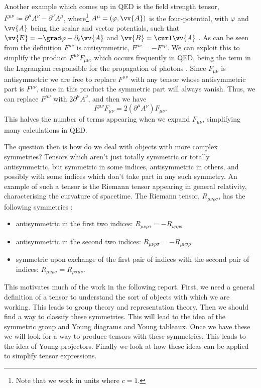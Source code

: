 \documentclass[fleqn]{NotesClass}
\begin{document}
    Another example which comes up in QED is the field strength tensor, \(F^{\mu\nu} \coloneqq \partial^\mu A^\nu - \partial^\nu A^\mu\), where\footnote{Note that we work in units where \(c = 1\).} \(A^\mu = (\varphi, \vv{A})\) is the four-potential, with \(\varphi\) and \(\vv{A}\) being the scalar and vector potentials, such that \(\vv{E} = -\grad\varphi - \partial_t\vv{A}\) and \(\vv{B} = \curl\vv{A}\) \cite[569]{griffiths}.
    As can be seen from the definition \(F^{\mu\nu}\) is antisymmetric, \(F^{\mu\nu} = -F^{\nu\mu}\).
    We can exploit this to simplify the product \(F^{\mu\nu}F_{\mu\nu}\), which occurs frequently in QED, being the term in the Lagrangian responsible for the propagation of photons \cite[294]{peskin}.
    Since \(F_{\mu\nu}\) is antisymmetric we are free to replace \(F^{\mu\nu}\) with any tensor whose antisymmetric part is \(F^{\mu\nu}\), since in this product the symmetric part will always vanish.
    Thus, we can replace \(F^{\mu\nu}\) with \(2\partial^\mu A^\nu\), and then we have
    \begin{equation}
        F^{\mu\nu}F_{\mu\nu} = 2(\partial^\mu A^\nu)F_{\mu\nu}.
    \end{equation}
    This halves the number of terms appearing when we expand \(F_{\mu\nu}\), simplifying many calculations in QED.
    
    The question then is how do we deal with objects with more complex symmetries?
    Tensors which aren't just totally symmetric or totally antisymmetric, but symmetric in some indices, antisymmetric in others, and possibly with some indices which don't take part in any such symmetry.
    An example of such a tensor is the Riemann tensor appearing in general relativity, characterising the curvature of spacetime.
    The Riemann tensor, \(R_{\mu\nu\rho\sigma}\), has the following symmetries \cite[141]{weinberg}:
    \begin{itemize}
        \item antisymmetric in the first two indices: \(R_{\mu\nu\rho\sigma} = -R_{\nu\mu\rho\sigma}\)
        \item antisymmetric in the second two indices: \(R_{\mu\nu\rho\sigma} = -R_{\mu\nu\sigma\rho}\)
        \item symmetric upon exchange of the first pair of indices with the second pair of indices: \(R_{\mu\nu\rho\sigma} = R_{\rho\sigma\mu\nu}\).
    \end{itemize}
    
    This motivates much of the work in the following report.
    First, we need a general definition of a tensor to understand the sort of objects with which we are working.
    This leads to group theory and representation theory.
    Then we should find a way to classify these symmetries.
    This will lead to the idea of the symmetric group and Young diagrams and Young tableaux.
    Once we have these we will look for a way to produce tensors with these symmetries.
    This leads to the idea of Young projectors.
    Finally we look at how these ideas can be applied to simplify tensor expressions.
    
\end{document}
